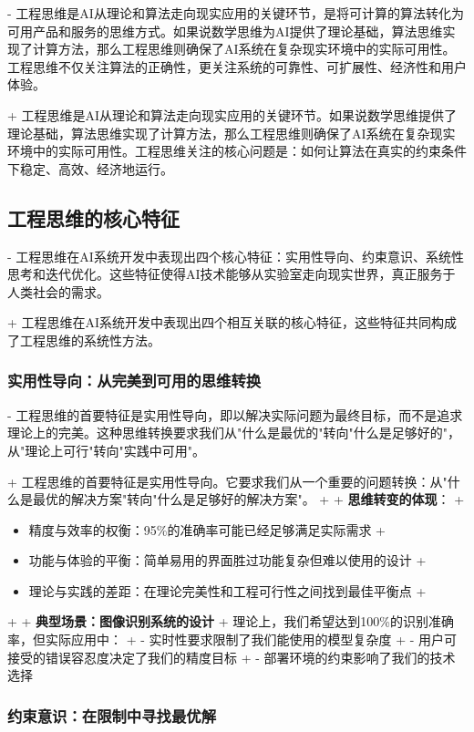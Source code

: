 - 工程思维是AI从理论和算法走向现实应用的关键环节，是将可计算的算法转化为可用产品和服务的思维方式。如果说数学思维为AI提供了理论基础，算法思维实现了计算方法，那么工程思维则确保了AI系统在复杂现实环境中的实际可用性。工程思维不仅关注算法的正确性，更关注系统的可靠性、可扩展性、经济性和用户体验。

+ 工程思维是AI从理论和算法走向现实应用的关键环节。如果说数学思维提供了理论基础，算法思维实现了计算方法，那么工程思维则确保了AI系统在复杂现实环境中的实际可用性。工程思维关注的核心问题是：如何让算法在真实的约束条件下稳定、高效、经济地运行。

\subsection{工程思维的核心特征}

- 工程思维在AI系统开发中表现出四个核心特征：实用性导向、约束意识、系统性思考和迭代优化。这些特征使得AI技术能够从实验室走向现实世界，真正服务于人类社会的需求。

+ 工程思维在AI系统开发中表现出四个相互关联的核心特征，这些特征共同构成了工程思维的系统性方法。

\subsubsection{实用性导向：从完美到可用的思维转换}

- 工程思维的首要特征是实用性导向，即以解决实际问题为最终目标，而不是追求理论上的完美。这种思维转换要求我们从"什么是最优的"转向"什么是足够好的"，从"理论上可行"转向"实践中可用"。

+ 工程思维的首要特征是实用性导向。它要求我们从一个重要的问题转换：从"什么是最优的解决方案"转向"什么是足够好的解决方案"。
+
+ \textbf{思维转变的体现}：
+ \begin{itemize}
+ \item 精度与效率的权衡：95\%的准确率可能已经足够满足实际需求
+ \item 功能与体验的平衡：简单易用的界面胜过功能复杂但难以使用的设计
+ \item 理论与实践的差距：在理论完美性和工程可行性之间找到最佳平衡点
+ \end{itemize}
+
+ \textbf{典型场景：图像识别系统的设计}
+ 理论上，我们希望达到100\%的识别准确率，但实际应用中：
+ - 实时性要求限制了我们能使用的模型复杂度
+ - 用户可接受的错误容忍度决定了我们的精度目标
+ - 部署环境的约束影响了我们的技术选择

\subsubsection{约束意识：在限制中寻找最优解}

